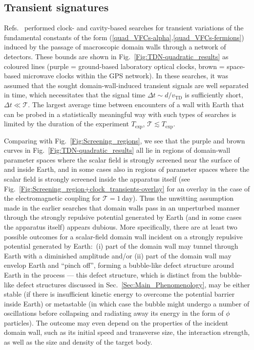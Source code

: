 \documentclass[aps,prd,onecolumn,nofootinbib]{revtex4-2} %
\begin{document}
\subsection{Transient signatures}
\label{Sec:TDM_Transients}
Refs.~\cite{Wcislo_2016_TDM-cavity,Roberts_2017_TDM-GPS,Wcislo_2018_TDM-cavity,Roberts_2019_TDM-clocks} performed clock- and cavity-based searches for transient variations of the fundamental constants of the form (\ref{quad_VFCs-alpha},\ref{quad_VFCs-fermions}) induced by the passage of macroscopic domain walls through a network of detectors. 
These bounds are shown in Fig.~\ref{Fig:TDN-quadratic_results} as coloured lines (purple = ground-based laboratory optical clocks, brown = space-based microwave clocks within the GPS network). 
In these searches, it was assumed that the sought domain-wall-induced transient signals are well separated in time, which necessitates that the signal time $\Delta t \sim d / v_\textrm{TD}$ is sufficiently short, $\Delta t \ll \mathcal{T}$. 
The largest average time between encounters of a wall with Earth that can be probed in a statistically meaningful way with such types of searches is limited by the duration of the experiment $T_\textrm{exp}$, $\mathcal{T} \lesssim T_\textrm{exp}$. 


Comparing with Fig.~\ref{Fig:Screening_regions}, we see that the purple and brown curves in Fig.~\ref{Fig:TDN-quadratic_results} all lie in regions of domain-wall parameter spaces where the scalar field is strongly screened near the surface of and inside Earth, and in some cases also in regions of parameter spaces where the scalar field is strongly screened inside the apparatus itself (see Fig.~\ref{Fig:Screening_region+clock_transients-overlay} for an overlay in the case of the electromagnetic coupling for $\mathcal{T} = 1~\textrm{day}$). 
Thus the unwitting assumption made in the earlier searches \cite{Wcislo_2016_TDM-cavity,Roberts_2017_TDM-GPS,Wcislo_2018_TDM-cavity,Roberts_2019_TDM-clocks} that domain walls pass in an unperturbed manner through the strongly repulsive potential generated by Earth (and in some cases the apparatus itself) appears dubious. 
More specifically, there are at least two possible outcomes for a scalar-field domain wall incident on a strongly repulsive potential generated by Earth:~(i) part of the domain wall may tunnel through Earth with a diminished amplitude and/or (ii) part of the domain wall may envelop Earth and ``pinch off'', forming a bubble-like defect structure around Earth in the process --- this defect structure, which is distinct from the bubble-like defect structures discussed in Sec.~\ref{Sec:Main_Phenomenology}, may be either stable (if there is insufficient kinetic energy to overcome the potential barrier inside Earth) or metastable (in which case the bubble might undergo a number of oscillations before collapsing and radiating away its energy in the form of $\phi$ particles). 
The outcome may even depend on the properties of the incident domain wall, such as its initial speed and transverse size, the interaction strength, as well as the size and density of the target body. 
\end{document}
